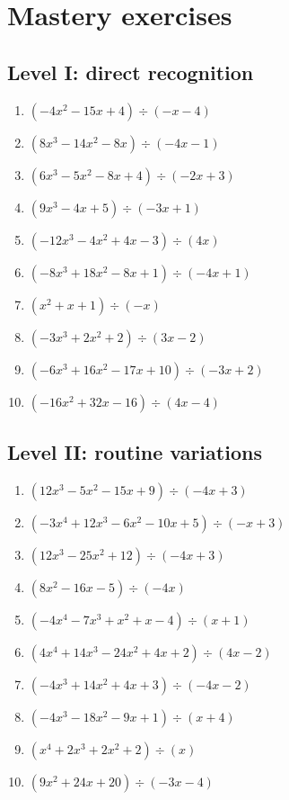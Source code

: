 \documentclass[11pt,oneside]{book}
\begin{document}
\section{Mastery exercises}
\subsection*{Level I: direct recognition}
\begin{enumerate}[leftmargin=*,label=\textbf{\arabic*.},itemsep=0.65\baselineskip]
\item $\displaystyle (- 4 x^{2} - 15 x + 4)\div(- x - 4)$
\item $\displaystyle (8 x^{3} - 14 x^{2} - 8 x)\div(- 4 x - 1)$
\item $\displaystyle (6 x^{3} - 5 x^{2} - 8 x + 4)\div(- 2 x + 3)$
\item $\displaystyle (9 x^{3} - 4 x + 5)\div(- 3 x + 1)$
\item $\displaystyle (- 12 x^{3} - 4 x^{2} + 4 x - 3)\div(4 x)$
\item $\displaystyle (- 8 x^{3} + 18 x^{2} - 8 x + 1)\div(- 4 x + 1)$
\item $\displaystyle (x^{2} + x + 1)\div(- x)$
\item $\displaystyle (- 3 x^{3} + 2 x^{2} + 2)\div(3 x - 2)$
\item $\displaystyle (- 6 x^{3} + 16 x^{2} - 17 x + 10)\div(- 3 x + 2)$
\item $\displaystyle (- 16 x^{2} + 32 x - 16)\div(4 x - 4)$
\end{enumerate}
\subsection*{Level II: routine variations}
\begin{enumerate}[leftmargin=*,label=\textbf{\arabic*.},itemsep=0.65\baselineskip]
\item $\displaystyle (12 x^{3} - 5 x^{2} - 15 x + 9)\div(- 4 x + 3)$
\item $\displaystyle (- 3 x^{4} + 12 x^{3} - 6 x^{2} - 10 x + 5)\div(- x + 3)$
\item $\displaystyle (12 x^{3} - 25 x^{2} + 12)\div(- 4 x + 3)$
\item $\displaystyle (8 x^{2} - 16 x - 5)\div(- 4 x)$
\item $\displaystyle (- 4 x^{4} - 7 x^{3} + x^{2} + x - 4)\div(x + 1)$
\item $\displaystyle (4 x^{4} + 14 x^{3} - 24 x^{2} + 4 x + 2)\div(4 x - 2)$
\item $\displaystyle (- 4 x^{3} + 14 x^{2} + 4 x + 3)\div(- 4 x - 2)$
\item $\displaystyle (- 4 x^{3} - 18 x^{2} - 9 x + 1)\div(x + 4)$
\item $\displaystyle (x^{4} + 2 x^{3} + 2 x^{2} + 2)\div(x)$
\item $\displaystyle (9 x^{2} + 24 x + 20)\div(- 3 x - 4)$
\end{enumerate}
\end{document}

